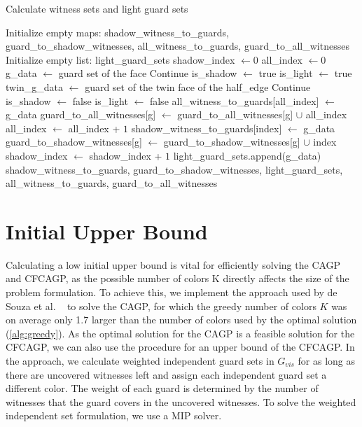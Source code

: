 \begin{algorithm}
\caption{Calculate witness sets and light guard sets}\label{alg:AVP_processing}
\begin{algorithmic}[1]
\State Initialize empty maps: shadow\_witness\_to\_guards, guard\_to\_shadow\_witnesses, all\_witness\_to\_guards, guard\_to\_all\_witnesses
\State Initialize empty list: light\_guard\_sets
\State shadow\_index $\gets 0$
\State all\_index $\gets 0$
    \State g\_data $\gets$ guard set of the face
        \State Continue
    \EndIf
    \State is\_shadow $\gets$ true
    \State is\_light $\gets$ true
        \State twin\_g\_data $\gets$ guard set of the twin face of the half\_edge
            \State Continue
        \EndIf
            \State is\_shadow $\gets$ false
        \EndIf
            \State is\_light $\gets$ false
        \EndIf
    \EndFor
    \State all\_witness\_to\_guards[all\_index] $\gets$ g\_data
        \State guard\_to\_all\_witnesses[g] $\gets$ guard\_to\_all\_witnesses[g] $\cup$ all\_index
    \EndFor
    \State all\_index $\gets$ all\_index + $1$
        \State shadow\_witness\_to\_guards[index] $\gets$ g\_data
            \State guard\_to\_shadow\_witnesses[g] $\gets$ guard\_to\_shadow\_witnesses[g] $\cup$ index
        \EndFor
        \State shadow\_index $\gets$ shadow\_index + $1$
    \EndIf
        \State light\_guard\_sets.append(g\_data)
    \EndIf
\EndFor
\State \Return shadow\_witness\_to\_guards, guard\_to\_shadow\_witnesses, light\_guard\_sets, all\_witness\_to\_guards, guard\_to\_all\_witnesses
\EndProcedure
\end{algorithmic}
\end{algorithm}

\section{Initial Upper Bound}
Calculating a low initial upper bound is vital for efficiently solving the CAGP and CFCAGP, as the possible number of colors K directly affects the size of the problem formulation. To achieve this, we implement the approach used by de Souza et al. ~\cite{zambon2014exact} to solve the CAGP, for which the greedy number of colors $K$ was on average only 1.7 larger than the number of colors used by the optimal solution (\cref{alg:greedy}). As the optimal solution for the CAGP is a feasible solution for the CFCAGP, we can also use the procedure for an upper bound of the CFCAGP. In the approach, we calculate weighted independent guard sets in $G_{vis}$ for as long as there are uncovered witnesses left and assign each independent guard set a different color. The weight of each guard is determined by the number of witnesses that the guard covers in the uncovered witnesses. To solve the weighted independent set formulation, we use a MIP solver.

